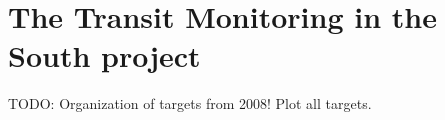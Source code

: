 \chapter{The Transit Monitoring in the South project}\label{chap:tramos}

TODO: Organization of targets from 2008! Plot all targets.